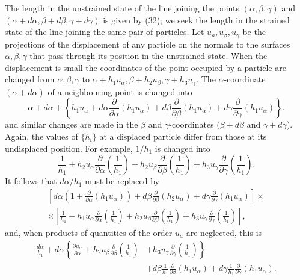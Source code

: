 The length in the unstrained state of the line joining the points \((\alpha,
\beta, \gamma)\) and \((\alpha+d \alpha, \beta+d \beta, \gamma+d \gamma)\) is
given by (32); we seek the length in the strained state of the line joining the
same pair of particles. Let \(u_a, u_\beta, u_\gamma \) be the projections of
the displacement of any particle on the normals to the surfaces \(\alpha,
\beta, \gamma \) that pass through its position in the unstrained state. When
the displacement is small the coordinates of the point occupied by a particle
are changed from \(\alpha, \beta, \gamma \) to
\(\alpha+h_1 u_\alpha, \beta+h_2 u_\beta, \gamma+h_3 u_\gamma \). The
\(\alpha \)-coordinate \((\alpha+d \alpha)\) of a neighbouring point is changed into
\[
\alpha+d \alpha+\left\{h_1 u_\alpha+d \alpha \frac{\partial}{\partial
\alpha}\left(h_1 u_\alpha \right)+d \beta \frac{\partial}{\partial
\beta}\left(h_1 u_\alpha \right)+d \gamma \frac{\partial}{\partial
\gamma}\left(h_1 u_\alpha \right)\right\}.
\]
and similar changes are made in the \(\beta \) and \(\gamma \)-coordinates
(\(\beta+d \beta \) and \(\gamma+d \gamma \)).  Again, the values of
\( \{h_i\} \) at a displaced particle differ from those at its undisplaced
position. For example, \(1 / h_1\) is changed into
\[
\frac{1}{h_1}+h_2 u_\alpha \frac{\partial}{\partial
\alpha}\left(\frac{1}{h_1}\right)+h_2 u_\beta \frac{\partial}{\partial
\beta}\left(\frac{1}{h_1}\right)+h_3 u_\gamma \frac{\partial}{\partial
\gamma}\left(\frac{1}{h_1}\right).
\]
It follows that \(d \alpha / h_1\) must be replaced by
\[
\begin{aligned} {\left[ d \alpha
\left(1+\frac{\partial}{\partial \alpha} \left(h_1 u_\alpha \right)\right)+
d \beta \frac{\partial}{\partial \beta}\left(h_2 u_\alpha \right)+
d \gamma \frac{\partial}{\partial \gamma}\left(h_1 u_\alpha \right)\right]}
\times \\
\times\left[ \frac{1}{h_1}+
h_1 u_\alpha \frac{\partial}{\partial \alpha} \left(\frac{1}{h_1}\right)+
h_2 u_\beta \frac{\partial}{\partial \beta}\left(\frac{1}{h_1}\right)+
h_3 u_\gamma \frac{\partial}{\partial \gamma}\left(\frac{1}{h_1}\right)
\right],
\end{aligned}
\]
and, when products of quantities of the order \(u_a\) are neglected, this is
\[
\begin{aligned}
\frac{d \alpha}{h_1}+d \alpha \left\{\frac{\partial u_\alpha}{\partial
\alpha}+h_2 u_\beta \frac{\partial}{\partial
\beta}\left(\frac{1}{h_1}\right)\right. & \left.+h_3 u_\gamma
\frac{\partial}{\partial \gamma}\left(\frac{1}{h_1}\right)\right\} \\
& +d \beta \frac{1}{h_1} \frac{\partial}{\partial \beta}\left(h_1
u_\alpha \right)+d \gamma \frac{1}{h_1} \frac{\partial}{\partial
\gamma}\left(h_1 u_\alpha \right) .
\end{aligned}
\]
